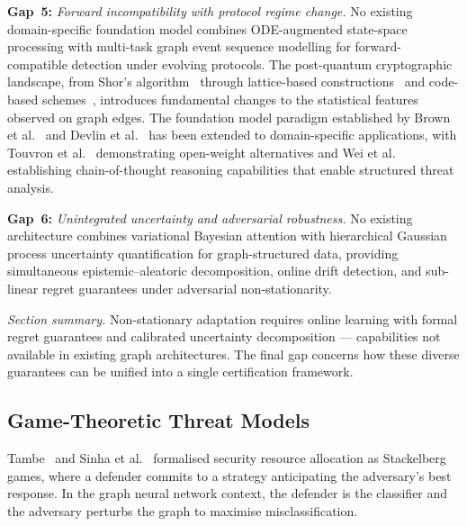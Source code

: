 \noindent\textbf{Gap~5:} \emph{Forward incompatibility with protocol regime change.} No existing domain-specific foundation model combines ODE-augmented state-space processing with multi-task graph event sequence modelling for forward-compatible detection under evolving protocols. The post-quantum cryptographic landscape, from Shor's algorithm~\cite{Shor1997} through lattice-based constructions~\cite{Ducas2018,Proos2003} and code-based schemes~\cite{McEliece1978}, introduces fundamental changes to the statistical features observed on graph edges. The foundation model paradigm established by Brown et al.~\cite{Brown2020} and Devlin et al.~\cite{Devlin2019} has been extended to domain-specific applications, with Touvron et al.~\cite{Touvron2023} demonstrating open-weight alternatives and Wei et al.~\cite{Wei2022cot} establishing chain-of-thought reasoning capabilities that enable structured threat analysis.

\medskip
\noindent\textbf{Gap~6:} \emph{Unintegrated uncertainty and adversarial robustness.} No existing architecture combines variational Bayesian attention with hierarchical Gaussian process uncertainty quantification for graph-structured data, providing simultaneous epistemic--aleatoric decomposition, online drift detection, and sub-linear regret guarantees under adversarial non-stationarity.

\medskip
\noindent\textit{Section summary.} Non-stationary adaptation requires online learning with formal regret guarantees and calibrated uncertainty decomposition --- capabilities not available in existing graph architectures. The final gap concerns how these diverse guarantees can be unified into a single certification framework.

\label{sec:certification}%

\subsection{Game-Theoretic Threat Models}

Tambe~\cite{Tambe2011} and Sinha et al.~\cite{Sinha2018} formalised security resource allocation as Stackelberg games, where a defender commits to a strategy anticipating the adversary's best response. In the graph neural network context, the defender is the classifier and the adversary perturbs the graph to maximise misclassification.

